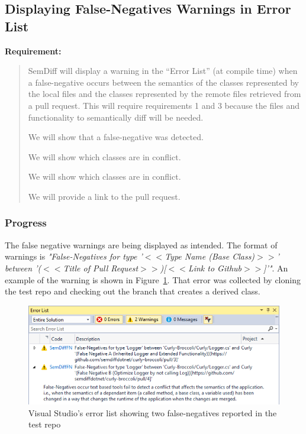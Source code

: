 \documentclass[draftclsnofoot,onecolumn]{IEEEtran}
\begin{document}
\subsection{Displaying False-Negatives Warnings in Error List}%

\textbf{Requirement:}

\begin{quote}

SemDiff will display a warning in the “Error List” (at compile time) when a 
false-negative occurs between the semantics of the classes represented by the 
local files and the classes represented by the remote files retrieved from a 
pull request. This will require requirements 1 and 3 because the files and 
functionality to semantically diff will be needed.

We will show that a false-negative was detected.

We will show which classes are in conflict.

We will show which classes are in conflict.

We will provide a link to the pull request.

\end{quote}

\subsubsection{Progress}

The false negative warnings are being displayed as intended. The format of 
warnings is \textit{"False-Negatives for type '$<<$Type Name (Base 
Class)$>>$' between '($<<$Title of Pull Request$>>$)[$<<$Link to 
Github$>>$]'"}. An example of the warning is shown in Figure~\ref{fnerrorlist}. 
That error was collected by cloning the test repo and checking out the branch 
that creates a derived class.

\begin{figure}[!t]
\centering
\includegraphics[scale=1]{FalseNegativeErrorList}
\caption{Visual Studio’s error list showing two false-negatives reported in 
the test repo}
\label{fnerrorlist}
\end{figure}
\end{document}
